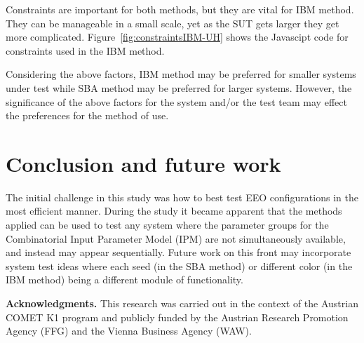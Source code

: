 \documentclass[conference]{IEEEtran}
\begin{document}
	Constraints are important for both methods, but they are vital for IBM method. 
	They can be manageable in a small scale, yet as the SUT gets larger they get more complicated. 
	Figure~\ref{fig:constraintsIBM-UH} shows the Javascipt code for constraints used in the IBM method.
	

	Considering the above factors, IBM method may be preferred for smaller systems under test while SBA method may be preferred for larger systems.
	However, the significance of the above factors for the system and/or the test team may effect the preferences for the method of use.
	
\section{Conclusion and future work}
	
The initial challenge in this study was how to best test EEO configurations in the most efficient manner.
During the study it became apparent that the methods applied can be used to test any system where the parameter groups for
the Combinatorial Input Parameter Model (IPM) are not simultaneously available, and instead may appear sequentially.
Future work on this front may incorporate system test ideas where each seed (in the SBA method) or different color (in the IBM method) being a different module of functionality.

\textbf{Acknowledgments.}
This research was carried out in the context of the Austrian COMET K1
program and publicly funded by the Austrian Research Promotion Agency
(FFG) and the Vienna Business Agency (WAW).



\end{document}
